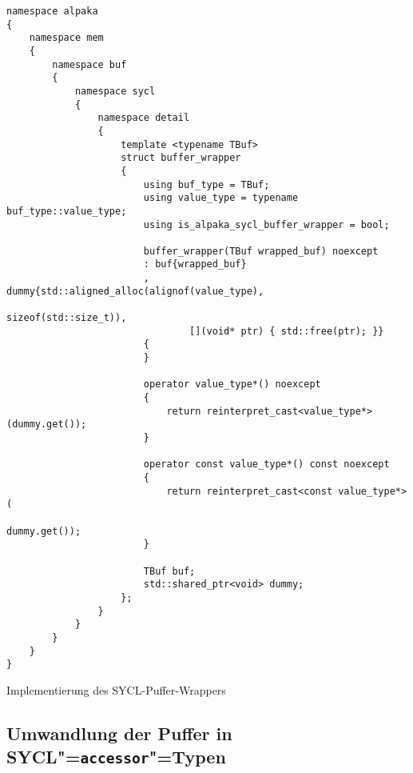 \begin{code}
    \begin{verbatim}
namespace alpaka
{
    namespace mem
    {
        namespace buf
        {
            namespace sycl
            {
                namespace detail
                {
                    template <typename TBuf>
                    struct buffer_wrapper
                    {
                        using buf_type = TBuf;
                        using value_type = typename buf_type::value_type;
                        using is_alpaka_sycl_buffer_wrapper = bool;

                        buffer_wrapper(TBuf wrapped_buf) noexcept
                        : buf{wrapped_buf}
                        , dummy{std::aligned_alloc(alignof(value_type),
                                                   sizeof(std::size_t)),
                                [](void* ptr) { std::free(ptr); }}
                        {
                        }

                        operator value_type*() noexcept
                        {
                            return reinterpret_cast<value_type*>(dummy.get());
                        }

                        operator const value_type*() const noexcept
                        {
                            return reinterpret_cast<const value_type*>(
                                                                dummy.get());
                        }

                        TBuf buf;
                        std::shared_ptr<void> dummy;
                    };
                }
            }
        }
    }
}
    \end{verbatim}
    \caption{Implementierung des SYCL-Puffer-Wrappers}
\end{code}

\subsection{Umwandlung der Puffer in SYCL"=\texttt{accessor}"=Typen}
\label{anhang:source:cpp:kernelzeigeracctrans}

